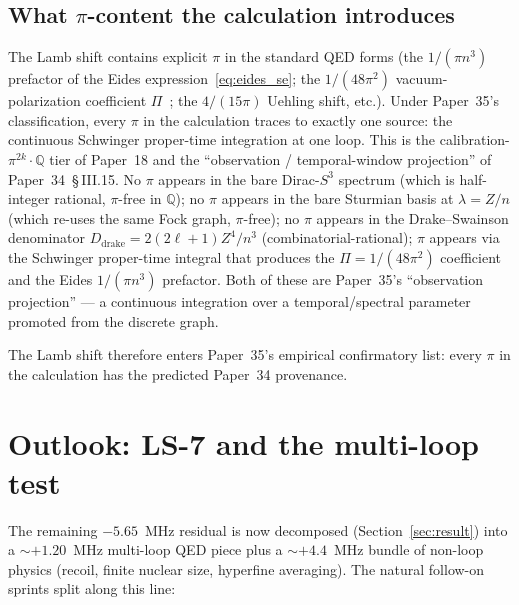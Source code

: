\documentclass[11pt]{article}
\begin{document}
\subsection{What $\pi$-content the calculation introduces}

The Lamb shift contains explicit $\pi$ in the standard QED forms (the
$1/(\pi n^3)$ prefactor of the Eides expression~\eqref{eq:eides_se};
the $1/(48\pi^2)$ vacuum-polarization coefficient
$\Pi$~\cite{paper28}; the $4/(15\pi)$ Uehling shift, etc.).  Under
Paper~35's classification, every $\pi$ in the calculation traces to
exactly one source: the continuous Schwinger proper-time integration
at one loop.  This is the calibration-$\pi^{2k}\cdot\mathbb{Q}$ tier
of Paper~18 and the ``observation / temporal-window projection''
of Paper~34~\S\,III.15.  No $\pi$ appears in the bare Dirac-$S^3$
spectrum (which is half-integer rational, $\pi$-free in $\mathbb{Q}$);
no $\pi$ appears in the bare Sturmian basis at $\lambda = Z/n$ (which
re-uses the same Fock graph, $\pi$-free); no $\pi$ appears in the
Drake--Swainson denominator $D_\text{drake} = 2(2\ell + 1) Z^4 / n^3$
(combinatorial-rational); $\pi$ appears via the Schwinger proper-time
integral that produces the $\Pi = 1/(48\pi^2)$ coefficient and the
Eides $1/(\pi n^3)$ prefactor.  Both of these are Paper~35's
``observation projection'' --- a continuous integration over a
temporal/spectral parameter promoted from the discrete graph.

The Lamb shift therefore enters Paper~35's empirical confirmatory
list: every $\pi$ in the calculation has the predicted Paper~34
provenance.

\section{Outlook: LS-7 and the multi-loop test}
\label{sec:outlook}

The remaining $-5.65$~MHz residual is now decomposed
(Section~\ref{sec:result}) into a $\sim +1.20$~MHz multi-loop QED
piece plus a $\sim +4.4$~MHz bundle of non-loop physics (recoil,
finite nuclear size, hyperfine averaging).  The natural follow-on
sprints split along this line:
\end{document}
